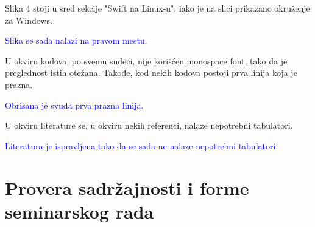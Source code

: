 \documentclass[a4paper]{report}
\newcommand{\odgovor}[1]{\textcolor{blue}{#1}}
\begin{document}
Slika 4 stoji u sred sekcije "Swift na Linux-u", iako je na slici prikazano okruženje za Windows.

\odgovor{Slika se sada nalazi na pravom mestu.}

U okviru kodova, po svemu sudeći, nije korišćen monospace font, tako da je preglednost istih otežana. Takođe, kod nekih kodova postoji prva linija koja je prazna.

\odgovor{Obrisana je svuda prva prazna linija.}

U okviru literature se, u okviru nekih referenci, nalaze nepotrebni tabulatori.

\odgovor{Literatura je ispravljena tako da se sada ne nalaze nepotrebni tabulatori.}

\section{Provera sadržajnosti i forme seminarskog rada}
\end{document}
